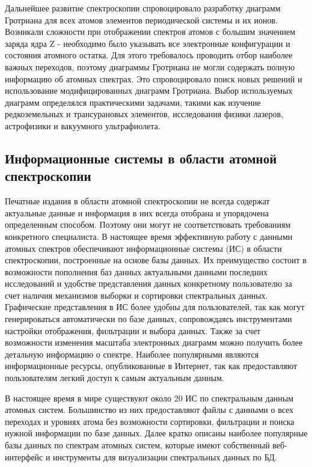 \documentclass[a4paper, 12pt]{article}
\begin{document}
    Дальнейшее развитие спектроскопии спровоцировало разработку диаграмм Гротриана для всех атомов элементов периодической системы и их ионов. Возникали сложности при отображении спектров атомов с большим значением заряда ядра Z - необходимо было указывать все электронные конфигурации и состояния атомного остатка. Для этого требовалось проводить отбор наиболее важных переходов, поэтому диаграммы Гротриана не могли содержать полную информацию об атомных спектрах. Это спровоцировало поиск новых решений и использование модифицированных диаграмм Гротриана. Выбор используемых диаграмм определялся практическими задачами, такими как изучение редкоземельных и трансурановых элементов, исследования физики лазеров, астрофизики и вакуумного ультрафиолета.
    
    \subsection{Информационные системы в области атомной спектроскопии}
    Печатные издания в области атомной спектроскопии не всегда содержат актуальные данные и информация в них всегда отобрана и упорядочена определенным способом. Поэтому они могут не соответствовать требованиям конкретного специалиста. В настоящее время эффективную работу с данными атомных спектров обеспечивают информационные системы (ИС) в области спектроскопии, построенные на основе базы данных. Их преимущество состоит в возможности пополнения баз данных актуальными данными последних исследований и удобстве представления данных конкретному пользователю за счет наличия механизмов выборки и сортировки спектральных данных. Графические представления в ИС более удобны для пользователей, так как могут генерироваться автоматически по базе данных, сопровождаясь инструментами настройки отображения, фильтрации и выбора данных. Также за счет возможности изменения масштаба электронных диаграмм можно получить более детальную информацию о спектре. Наиболее популярными являются информационные ресурсы, опубликованные в Интернет, так как предоставляют пользователям легкий доступ к самым актуальным данным.\par
    В настоящее время в мире существуют около 20 ИС по спектральным данным атомных систем. Большинство из них предоставляют файлы с данными о всех переходах и уровнях атома без возможности сортировки, фильтрации и поиска нужной информации по базе данных. Далее кратко описаны наиболее популярные базы данных по спектрам атомных систем, которые имеют собственный веб-интерфейс и инструменты для визуализации спектральных данных по БД.\par
\end{document}
